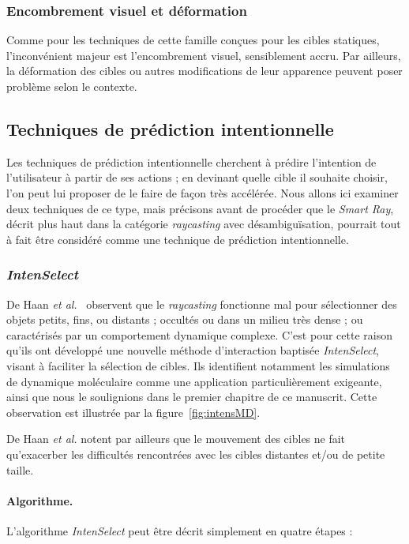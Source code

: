 	\subsubsection{Encombrement visuel et déformation}
	Comme pour les techniques de cette famille conçues pour les cibles statiques, l'inconvénient majeur est l'encombrement visuel, sensiblement accru. Par ailleurs, la déformation des cibles ou autres modifications de leur apparence peuvent poser problème selon le contexte.

	\subsection{Techniques de prédiction intentionnelle}
	Les techniques de prédiction intentionnelle cherchent à prédire l'intention de l'utilisateur à partir de ses actions ; en \og devinant \fg{} quelle cible il souhaite choisir, l'on peut lui proposer de le faire de façon très accélérée. Nous allons ici examiner deux techniques de ce type, mais précisons avant de procéder que le \emph{Smart Ray}, décrit plus haut dans la catégorie \emph{raycasting} avec désambiguïsation, pourrait tout à fait être considéré comme une technique de prédiction intentionnelle.
	
	\subsubsection{\emph{IntenSelect}}
	De Haan \emph{et al.}~\cite{de2005intenselect} observent que le \emph{raycasting} fonctionne mal pour sélectionner des objets petits, fins, ou distants ; occultés ou dans un milieu très dense ; ou caractérisés par un comportement dynamique complexe. C'est pour cette raison qu'ils ont développé une nouvelle méthode d'interaction baptisée \emph{IntenSelect}, visant à faciliter la sélection de cibles. Ils identifient notamment les simulations de dynamique moléculaire comme une application particulièrement exigeante, ainsi que nous le soulignions dans le premier chapitre de ce manuscrit. Cette observation est illustrée par la figure~\ref{fig:intensMD}.
	
	De Haan \emph{et al.} notent par ailleurs que le mouvement des cibles ne fait qu'exacerber les difficultés rencontrées avec les cibles distantes et/ou de petite taille.
	
	\paragraph{Algorithme.}
	L'algorithme \emph{IntenSelect} peut être décrit simplement en quatre étapes :
	
